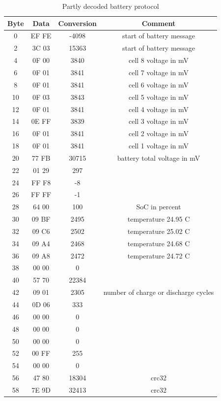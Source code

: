 \documentclass[12pt]{article}
\begin{document}
        \begin{table}
            \centering
            \begin{tabular}{|c|c|c|c|}
                \hline
                Byte & Data & Conversion & Comment \\
                \hline
                0 & EF FE & -4098 & start of battery message \\
                2 & 3C 03 & 15363 & start of battery message \\
                4 & 0F 00 & 3840 & cell 8 voltage in mV \\
                6 & 0F 01 & 3841 & cell 7 voltage in mV \\
                8 & 0F 01 & 3841 & cell 6 voltage in mV \\
                10 & 0F 03 & 3843 & cell 5 voltage in mV \\
                12 & 0F 01 & 3841 & cell 4 voltage in mV \\
                14 & 0E FF & 3839 & cell 3 voltage in mV \\
                16 & 0F 01 & 3841 & cell 2 voltage in mV \\
                18 & 0F 01 & 3841 & cell 1 voltage in mV \\
                20 & 77 FB & 30715 & battery total voltage in mV \\
                22 & 01 29 & 297 &  \\
                24 & FF F8 & -8 &  \\
                26 & FF FF & -1 &  \\
                28 & 64 00 & 100 & SoC in percent \\
                30 & 09 BF & 2495 & temperature 24.95 C \\
                32 & 09 C6 & 2502 & temperature 25.02 C \\
                34 & 09 A4 & 2468 & temperature 24.68 C \\
                36 & 09 A8 & 2472 & temperature 24.72 C \\
                38 & 00 00 & 0 &  \\
                40 & 57 70 & 22384 &  \\
                42 & 09 01 & 2305 & number of charge or discharge cycles \\
                44 & 0D 06 & 333 &  \\
                46 & 00 00 & 0 &  \\
                48 & 00 00 & 0 &  \\
                50 & 00 00 & 0 &  \\
                52 & 00 FF & 255 &  \\
                54 & 00 00 & 0 &  \\
                56 & 47 80 & 18304 & crc32 \\
                58 & 7E 9D & 32413 & crc32 \\
                \hline
                \end{tabular}
                \label{table:battery_protocol}
            \caption{Partly decoded battery protocol}
        \end{table}
\end{document}
